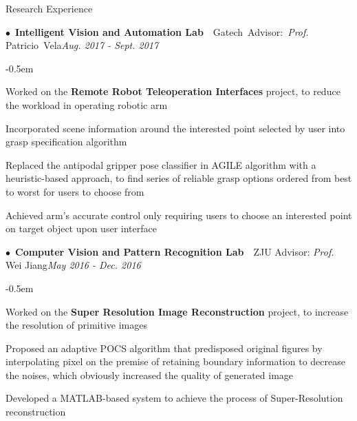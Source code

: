 \documentclass{resume} %
\begin{document}
\begin{rSection}{Research Experience}


\begin{spacing}{0.4}
$\bullet$~{\bf Intelligent Vision and Automation Lab}~~{Gatech~Advisor:~{\em Prof.} Patricio~Vela}\hfill{\em Aug. 2017 - Sept. 2017}\smallskip\\
\end{spacing}
\begin{list}{--}{\leftmargin=1em}
	\itemsep -0.5em \vspace{-0.5em}
\item Worked on the {\bfseries Remote Robot Teleoperation Interfaces} project, to reduce the workload in operating robotic arm
\item Incorporated scene information around the interested point selected by user into grasp specification algorithm
\item Replaced the antipodal gripper pose classifier in AGILE algorithm with a heuristic-based approach, to find series of reliable grasp options ordered from best to worst for users to choose from
\item Achieved arm's accurate control only requiring users to choose an interested point on target object upon user interface
	
\end{list}



\begin{spacing}{0.4}
$\bullet$~{\bf Computer Vision and Pattern Recognition Lab}~~{ZJU Advisor: {\em Prof.} Wei Jiang}\hfill{\em May 2016 - Dec. 2016}\smallskip\\
\end{spacing}
\begin{list}{--}{\leftmargin=1em}
	\itemsep -0.5em \vspace{-0.5em}
\item Worked on the {\bfseries Super Resolution Image Reconstruction} project, to increase the resolution of primitive images
\item Proposed an adaptive POCS algorithm that predisposed original figures by interpolating pixel on the premise of retaining boundary information to decrease the noises, which obviously increased the quality of generated image
\item Developed a MATLAB-based system to achieve the process of Super-Resolution reconstruction
\end{list}


\end{rSection}
\end{document}
